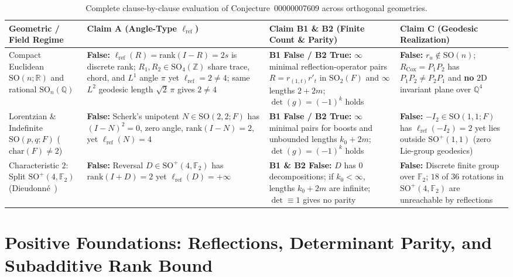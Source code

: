 \documentclass[11pt,a4paper]{article}
\theoremstyle{plain}
\theoremstyle{definition}
\newcommand{\R}{\mathbb{R}}
\newcommand{\Q}{\mathbb{Q}}
\newcommand{\Z}{\mathbb{Z}}
\newcommand{\F}{\mathbb{F}}
\newcommand{\SO}{\mathrm{SO}}
\newcommand{\lref}{\ell_{\mathrm{ref}}}
\newcommand{\rk}{\mathrm{rank}}
\begin{document}
\begin{table}[ht]
\centering
\footnotesize
\setlength{\tabcolsep}{4.5pt}
\begin{tabular}{>{\raggedright\arraybackslash}p{3.4cm}>{\raggedright\arraybackslash}p{3.5cm}>{\raggedright\arraybackslash}p{3.6cm}>{\raggedright\arraybackslash}p{3.8cm}}
\hline
\textbf{Geometric / Field Regime} & \textbf{Claim A (Angle-Type $\lref$)} & \textbf{Claim B1 \& B2 (Finite Count \& Parity)} & \textbf{Claim C (Geodesic Realization)} \\
\hline
Compact Euclidean $\SO(n; \R)$ and rational $\SO_n(\Q)$ &
\textbf{False:} $\lref(R) = \rk(I - R) = 2s$ is discrete rank; $R_1, R_2 \in \SO_4(\Z)$ share trace, chord, and $L^1$ angle $\pi$ yet $\lref = 2 \neq 4$; same $L^2$ geodesic length $\sqrt{2}\,\pi$ gives $2 \neq 4$ &
\textbf{B1 False / B2 True:} $\infty$ minimal reflection-operator pairs $R = r_{(1,t)} r'_t$ in $\SO_2(F)$ and $\infty$ lengths $2+2m$; $\det(g) = (-1)^k$ holds &
\textbf{False:} $r_u \notin \SO(n)$; $R_{\mathrm{Cox}} = P_1 P_2$ has $P_1 P_2 \neq P_2 P_1$ and \textbf{no} $2$D invariant plane over $\Q^4$ \\
\hline
Lorentzian \& Indefinite $\SO(p,q; F)$ ($\mathrm{char}(F) \neq 2$) &
\textbf{False:} Scherk's unipotent $N \in \SO(2,2; F)$ has $(I-N)^2 = 0$, zero angle, $\rk(I-N) = 2$, yet $\lref(N) = 4$ &
\textbf{B1 False / B2 True:} $\infty$ minimal pairs for boosts and unbounded lengths $k_0 + 2m$; $\det(g) = (-1)^k$ holds &
\textbf{False:} $-I_2 \in \SO(1,1; F)$ has $\lref(-I_2) = 2$ yet lies outside $\SO^+(1,1)$ (zero Lie-group geodesics) \\
\hline
Characteristic $2$: Split $\SO^+(4, \F_2)$ (Dieudonn\'e~\cite{Die48}) &
\textbf{False:} Reversal $D \in \SO^+(4, \F_2)$ has $\rk(I+D)=2$ yet $\lref(D) = +\infty$ &
\textbf{B1 \& B2 False:} $D$ has $0$ decompositions; if $k_0 < \infty$, lengths $k_0 + 2m$ are infinite; $\det \equiv 1$ gives no parity &
\textbf{False:} Discrete finite group over $\F_2$; $18$ of $36$ rotations in $\SO^+(4, \F_2)$ are unreachable by reflections \\
\hline
\end{tabular}
\caption{Complete clause-by-clause evaluation of Conjecture~00000007609 across orthogonal geometries.}
\label{tab:verdict}
\end{table}

\section{Positive Foundations: Reflections, Determinant Parity, and Subadditive Rank Bound}
\end{document}
